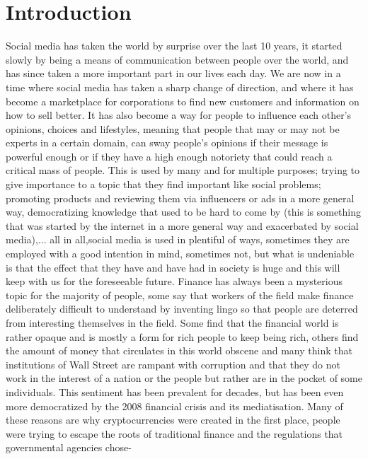 \documentclass[conference]{IEEEtran}
\begin{document}
\section{Introduction}
Social media has taken  the world by surprise over the last 10 years, it started slowly by being a means of communication between people over the world, and has since taken a more important part in our lives each day. We are now in a time where social media has taken a sharp change of direction, and where it has become a marketplace for corporations to find new customers and information on how to sell better. It has also become a way for people to influence each other's opinions, choices and lifestyles, meaning that people that may or may not be experts in a certain domain, can sway people’s opinions if their message is powerful enough or if they have a high enough notoriety that could reach a critical mass of people. This is used by many and for multiple purposes; trying to give importance to a topic that they find important like social problems; promoting products and reviewing them via influencers or ads in a more general way, democratizing knowledge that used to be hard to come by (this is something that was started by the internet in a more general way and exacerbated by social media),... all in all,social media is used in plentiful of ways, sometimes they are employed with a good intention in mind, sometimes not, but what is undeniable is that the effect that they have and have had in society is huge and this will keep with us for the foreseeable future.
\newline
\newline
Finance has always been a mysterious topic for the majority of people, some say that workers of the field make finance deliberately difficult to understand by inventing lingo so that people are deterred from interesting themselves in the field. Some find that the financial world is rather opaque and is mostly a form for rich people to keep being rich, others find the amount of money that circulates in this world obscene and many think that institutions of Wall Street are rampant with corruption and that they do not work in the interest of a nation or the people but rather are in the pocket of some individuals. This sentiment has been prevalent for decades, but has been even more democratized by the 2008 financial crisis and its mediatisation. 
\newline
\newline
Many of these reasons are why cryptocurrencies were created in the first place, people were trying to escape the roots of traditional finance and the regulations that governmental agencies chose-
\end{document}
